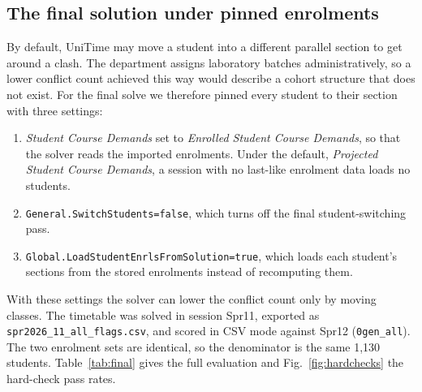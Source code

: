 \documentclass[journal]{IEEEtran}
\begin{document}
\subsection{The final solution under pinned enrolments}
\label{sec:final}

By default, UniTime may move a student into a different parallel section to get around a clash. The department assigns laboratory batches administratively, so a lower conflict count achieved this way would describe a cohort structure that does not exist. For the final solve we therefore pinned every student to their section with three settings:

\begin{enumerate}
\item \emph{Student Course Demands} set to \emph{Enrolled Student Course Demands}, so that the solver reads the imported enrolments. Under the default, \emph{Projected Student Course Demands}, a session with no last-like enrolment data loads no students.
\item \texttt{General.SwitchStudents=false}, which turns off the final student-switching pass.
\item \texttt{Global.LoadStudentEnrlsFromSolution=true}, which loads each student's sections from the stored enrolments instead of recomputing them.
\end{enumerate}

With these settings the solver can lower the conflict count only by moving classes. The timetable was solved in session Spr11, exported as \texttt{spr2026\_11\_all\_flags.csv}, and scored in CSV mode against Spr12 (\texttt{0gen\_all}). The two enrolment sets are identical, so the denominator is the same 1{,}130 students.
Table~\ref{tab:final} gives the full evaluation and Fig.~\ref{fig:hardchecks} the hard-check pass rates.
\end{document}
